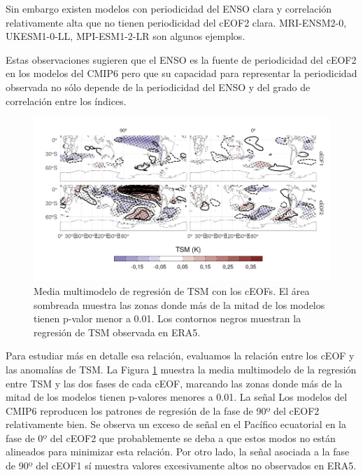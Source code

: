 \documentclass[12pt,oneside,a4paper]{reedthesis}
\begin{document}
Sin embargo existen modelos con periodicidad del ENSO clara y correlación relativamente alta que no tienen periodicidad del cEOF2 clara.
MRI-ENSM2-0, UKESM1-0-LL, MPI-ESM1-2-LR son algunos ejemplos.

Estas observaciones sugieren que el ENSO es la fuente de periodicidad del cEOF2 en los modelos del CMIP6 pero que su capacidad para representar la periodicidad observada no sólo depende de la periodicidad del ENSO y del grado de correlación entre los índices.



\begin{figure}

{\centering \includegraphics{figures/50-cmip6/sst-mmm-1} 

}

\caption{Media multimodelo de regresión de TSM con los cEOFs. El área sombreada muestra las zonas donde más de la mitad de los modelos tienen p-valor menor a 0.01. Los contornos negros muestran la regresión de TSM observada en ERA5.}\label{fig:sst-mmm}
\end{figure}

Para estudiar más en detalle esa relación, evaluamos la relación entre los cEOF y las anomalías de TSM.
La Figura \ref{fig:sst-mmm} muestra la media multimodelo de la regresión entre TSM y las dos fases de cada cEOF, marcando las zonas donde más de la mitad de los modelos tienen p-valores menores a 0.01.
La señal Los modelos del CMIP6 reproducen los patrones de regresión de la fase de 90º del cEOF2 relativamente bien.
Se observa un exceso de señal en el Pacífico ecuatorial en la fase de 0º del cEOF2 que probablemente se deba a que estos modos no están alineados para minimizar esta relación.
Por otro lado, la señal asociada a la fase de 90º del cEOF1 sí muestra valores excesivamente altos no observados en ERA5.
\end{document}
